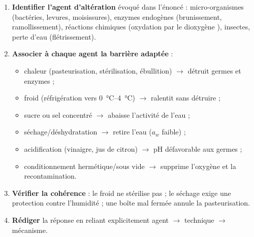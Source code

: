 \documentclass[11pt]{article}
\begin{document}
\begin{methode}
\begin{enumerate}
\item \textbf{Identifier l'agent d'altération} évoqué dans l'énoncé : micro-organismes (bactéries, levures, moisissures), enzymes endogènes (brunissement, ramollissement), réactions chimiques (oxydation par le dioxygène ), insectes, perte d'eau (flétrissement).
\item \textbf{Associer à chaque agent la barrière adaptée} :
\begin{itemize}
\item chaleur (pasteurisation, stérilisation, ébullition) $\rightarrow$ détruit germes et enzymes ;
\item froid (réfrigération vers \SIrange{0}{4}{\celsius}) $\rightarrow$ ralentit sans détruire ;
\item sucre ou sel concentré $\rightarrow$ abaisse l'activité de l'eau ;
\item séchage/déshydratation $\rightarrow$ retire l'eau ($a_w$ faible) ;
\item acidification (vinaigre, jus de citron) $\rightarrow$ pH défavorable aux germes ;
\item conditionnement hermétique/sous vide $\rightarrow$ supprime l'oxygène et la recontamination.
\end{itemize}
\item \textbf{Vérifier la cohérence} : le froid ne stérilise pas ; le séchage exige une protection contre l'humidité ; une boîte mal fermée annule la pasteurisation.
\item \textbf{Rédiger} la réponse en reliant explicitement agent $\rightarrow$ technique $\rightarrow$ mécanisme.
\end{enumerate}
\end{methode}
\end{document}
